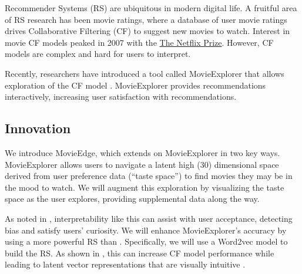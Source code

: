 Recommender Systems (RS) are ubiquitous in modern digital life. A fruitful area of RS research has been movie ratings, where a database of user movie ratings drives Collaborative Filtering (CF) to suggest new movies to watch. Interest in movie CF models peaked in 2007 with the \href{https://www.netflixprize.com/}{The Netflix Prize}. However, CF models are complex and hard for users to interpret.

Recently, researchers have introduced a tool called MovieExplorer that allows exploration of the CF model \cite{taijala2018movieexplorer}. MovieExplorer provides recommendations interactively, increasing user satisfaction with recommendations.

\subsection{Innovation}

We introduce MovieEdge, which extends on MovieExplorer in two key ways. MovieExplorer allows users to navigate a latent high (30) dimensional space derived from user preference data (“taste space”) to find movies they may be in the mood to watch. We will augment this exploration by visualizing the taste space as the user explores, providing supplemental data along the way.

As noted in \cite{Molnar2019interpretable}, interpretability like this can assist with user acceptance, detecting bias and satisfy users’ curiosity. We will enhance MovieExplorer’s accuracy  by using a more powerful RS than \cite{taijala2018movieexplorer}. Specifically, we will use a Word2vec model \cite{mikolov2013distributed} to build the RS. As shown in \cite{ozsoy2016word}, this can increase CF model performance while leading to latent vector representations that are visually intuitive \cite{mikolov2013distributed}. 